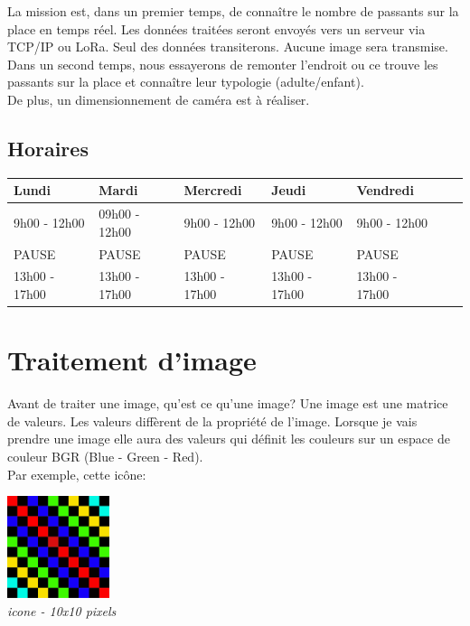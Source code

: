 \documentclass[12pt, french]{report}
\begin{document}
La mission est, dans un premier temps, de connaître le nombre de passants sur la place en temps réel. Les données traitées seront envoyés vers un serveur via TCP/IP ou LoRa. Seul des données transiterons. Aucune image sera transmise.\\ 

Dans un second temps, nous essayerons de remonter l'endroit ou ce trouve les passants sur la place et connaître leur typologie (adulte/enfant).\\

De plus, un dimensionnement de caméra est à réaliser.


\subsection*{Horaires}

\begin{center}
        \begin{tabular}{|l|l|l|l|l|c|r|}
                \hline
                Lundi & Mardi & Mercredi & Jeudi & Vendredi \\
                \hline
                9h00 - 12h00 & 09h00 - 12h00 & 9h00 - 12h00 & 9h00 - 12h00 & 9h00 - 12h00 \\
                \hline
                PAUSE&PAUSE&PAUSE&PAUSE&PAUSE\\
                \hline
                13h00 - 17h00 & 13h00 - 17h00 & 13h00 - 17h00 & 13h00 - 17h00 & 13h00 - 17h00 \\ 
                \hline
        \end{tabular}
\end{center}
\newpage

\newpage
\strut									      %
\newpage							              %
\newpage

\section{Traitement d'image}
Avant de traiter une image, qu'est ce qu'une image? Une image est une matrice de valeurs. Les valeurs diffèrent de la propriété de l'image. Lorsque je vais prendre une image elle aura des valeurs qui définit les couleurs sur un espace de couleur BGR (Blue - Green - Red).\\

Par exemple, cette icône:\\
\begin{center}
\includegraphics[width=3cm,heigth=3cm]{Images/iconeGrande.PNG}\\
\textit{icone - 10x10 pixels}
\end{center}
\end{document}
